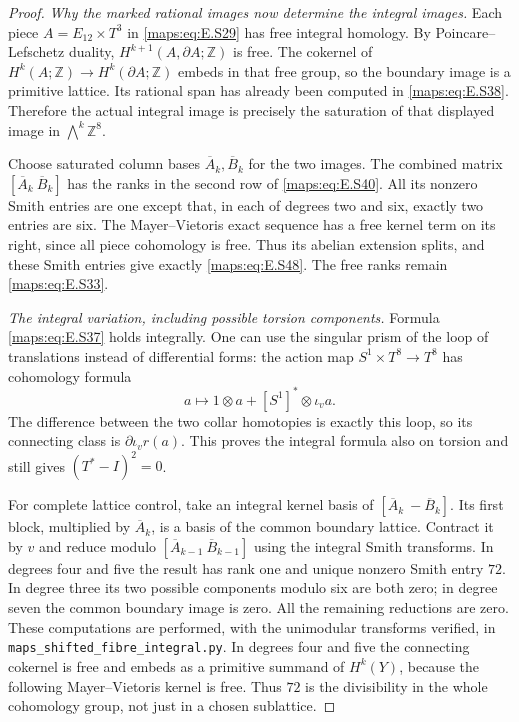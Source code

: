 \begin{proof}
\emph{Why the marked rational images now determine the integral images.}
Each piece $A=E_{12}\times T^3$ in \eqref{maps:eq:E.S29} has free
integral homology. By Poincare--Lefschetz duality,
$H^{k+1}(A,\partial A;\mathbb Z)$ is free. The cokernel
of $H^k(A;\mathbb Z)\to H^k(\partial A;\mathbb Z)$
embeds in that free group, so the boundary image is a
primitive lattice. Its rational span has already been
computed in \eqref{maps:eq:E.S38}. Therefore the actual integral
image is precisely the saturation of that displayed
image in $\bigwedge^k\mathbb Z^8$.

Choose saturated column bases $\overline A_k,\overline B_k$
for the two images. The combined matrix
$[\overline A_k\ \overline B_k]$ has the ranks in the
second row of \eqref{maps:eq:E.S40}. All its nonzero Smith entries are
one except that, in each of degrees two and six, exactly
two entries are six. The Mayer--Vietoris exact sequence
has a free kernel term on its right, since all piece
cohomology is free. Thus its abelian extension splits,
and these Smith entries give exactly \eqref{maps:eq:E.S48}. The free
ranks remain \eqref{maps:eq:E.S33}.

\emph{The integral variation, including possible torsion components.}
Formula \eqref{maps:eq:E.S37} holds integrally. One can use the singular
prism of the loop of translations instead of differential
forms: the action map $S^1\times T^8\to T^8$ has
cohomology formula
\[
 a\longmapsto 1\otimes a+[S^1]^*\otimes\iota_v a.
\]
The difference between the two collar homotopies is
exactly this loop, so its connecting class is
$\partial\iota_v r(a)$. This proves the integral formula
also on torsion and still gives $(T^*-I)^2=0$.

For complete lattice control, take an integral kernel
basis of $[\overline A_k\ -\overline B_k]$. Its first
block, multiplied by $\overline A_k$, is a basis of the
common boundary lattice. Contract it by $v$ and reduce
modulo $[\overline A_{k-1}\ \overline B_{k-1}]$ using
the integral Smith transforms. In degrees four and five
the result has rank one and unique nonzero Smith entry
$72$. In degree three its two possible components
modulo six are both zero; in degree seven the common
boundary image is zero. All the remaining reductions
are zero. These computations are performed, with the
unimodular transforms verified, in
\texttt{maps\_shifted\_fibre\_integral.py}.
In degrees four and five the connecting cokernel is
free and embeds as a primitive summand of $H^k(Y)$,
because the following Mayer--Vietoris kernel is free.
Thus $72$ is the divisibility in the whole cohomology
group, not just in a chosen sublattice.


\end{proof}
